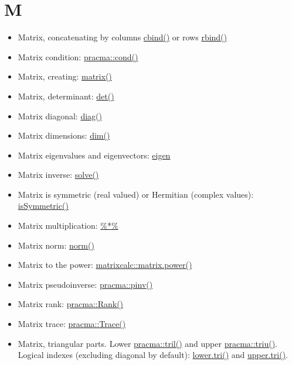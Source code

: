 \documentclass[
]{book}
\providecommand{\tightlist}{%
  \setlength{\itemsep}{0pt}\setlength{\parskip}{0pt}}
\begin{document}
\hypertarget{m}{%
\section*{M}\label{m}}

\begin{itemize}
\tightlist
\item
  Matrix, concatenating by columns \href{https://stat.ethz.ch/R-manual/R-patched/library/base/html/cbind.html}{cbind()} or rows \href{https://stat.ethz.ch/R-manual/R-patched/library/base/html/cbind.html}{rbind()}
\item
  Matrix condition: \href{https://rdrr.io/rforge/pracma/man/cond.html}{pracma::cond()}
\item
  Matrix, creating: \href{https://stat.ethz.ch/R-manual/R-patched/library/base/html/matrix.html}{matrix()}
\item
  Matrix, determinant: \href{https://stat.ethz.ch/R-manual/R-patched/library/base/html/det.html}{det()}
\item
  Matrix diagonal: \href{https://stat.ethz.ch/R-manual/R-patched/library/base/html/diag.html}{diag()}
\item
  Matrix dimensions: \href{https://stat.ethz.ch/R-manual/R-patched/library/base/html/dim.html}{dim()}
\item
  Matrix eigenvalues and eigenvectors: \href{https://stat.ethz.ch/R-manual/R-devel/library/base/html/eigen.html}{eigen}
\item
  Matrix inverse: \href{https://stat.ethz.ch/R-manual/R-devel/library/base/html/solve.html}{solve()}
\item
  Matrix is symmetric (real valued) or Hermitian (complex values): \href{https://stat.ethz.ch/R-manual/R-patched/library/base/html/isSymmetric.html}{isSymmetric()}
\item
  Matrix multiplication: \href{https://stat.ethz.ch/R-manual/R-patched/library/base/html/matmult.html}{\%*\%}
\item
  Matrix norm: \href{https://stat.ethz.ch/R-manual/R-patched/library/base/html/norm.html}{norm()}
\item
  Matrix to the power: \href{https://www.rdocumentation.org/packages/matrixcalc/versions/1.0-3/topics/matrix.power}{matrixcalc::matrix.power()}
\item
  Matrix pseudoinverse: \href{https://rdrr.io/cran/pracma/man/pinv.html}{pracma::pinv()}
\item
  Matrix rank: \href{https://rdrr.io/rforge/pracma/man/rank.html}{pracma::Rank()}
\item
  Matrix trace: \href{https://rdrr.io/rforge/pracma/man/trace.html}{pracma::Trace()}
\item
  Matrix, triangular parts. Lower \href{https://rdrr.io/rforge/pracma/man/tri.html}{pracma::tril()} and upper \href{https://rdrr.io/rforge/pracma/man/tri.html}{pracma::triu()}. Logical indexes (excluding diagonal by default): \href{https://stat.ethz.ch/R-manual/R-patched/library/base/html/lower.tri.html}{lower.tri()} and \href{https://stat.ethz.ch/R-manual/R-patched/library/base/html/lower.tri.html}{upper.tri()}.
\end{itemize}
\end{document}
